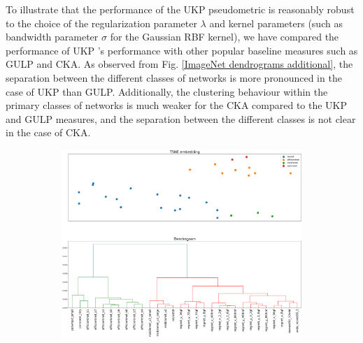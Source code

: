 \documentclass{article}
\theoremstyle{plain}
\newcommand{\metricstname}{UKP }
\begin{document}
To illustrate that the performance of the \metricstname pseudometric is reasonably robust to the choice of the regularization parameter $\lambda$ and kernel parameters (such as bandwidth parameter $\sigma$ for the Gaussian RBF kernel), we have compared the performance of \metricstname's performance with other popular baseline measures such as GULP and CKA. As observed from Fig. \ref{ImageNet dendrograms additional}, the separation between the different classes of networks is more pronounced in the case of \metricstname than GULP. Additionally, the clustering behaviour within the primary classes of networks is much weaker for the CKA compared to the \metricstname and GULP measures, and the separation between the different classes is not clear in the case of CKA.

\begin{figure}[!h]
    \centering

    \hspace*{\fill}
    \begin{subfigure}[b]{0.45\textwidth}
        \includegraphics[width=\textwidth]{Appendix figures/imagenet_experiments/Additional comparisons for UKP with GULP and CKA/DendogramandTSNE for UKP_dist_RBF_1.000000e+00_1.000000e+01_mainpaper.png}
    \end{subfigure}
    \hspace*{\fill}

    \vspace{0.5cm}  %
    

\end{figure}
\end{document}
